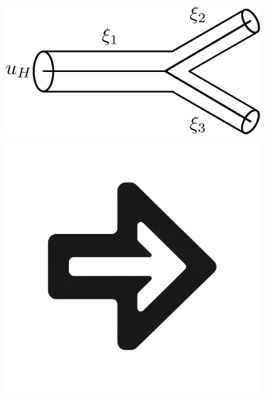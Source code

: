 \documentclass{beamer}
\begin{document}
\begin{frame}
\begin{figure}[htbp]
\begin{minipage}[t][0.06\paperheight][t]{\linewidth}
			\begin{minipage}{0.1\linewidth}
				\caption*{\tiny}
			\end{minipage}
		\end{minipage}
		\begin{minipage}[c][0.35\paperheight][c]{\linewidth}
			\begin{minipage}{0.19\linewidth}
				\includegraphics[width=\linewidth]{images/bifurcation.eps}
			\end{minipage}
			\begin{minipage}{0.1\linewidth}
				\includegraphics[width=\linewidth]{images/right_arrow.png}
			\end{minipage}
			\begin{minipage}{0.19\linewidth}

\end{minipage}
\end{minipage}
\end{figure}
\end{frame}
\end{document}
